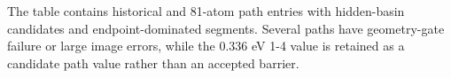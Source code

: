 The table contains historical and 81-atom path entries with hidden-basin candidates and endpoint-dominated segments. Several paths have geometry-gate failure or large image errors, while the 0.336 eV 1-4 value is retained as a candidate path value rather than an accepted barrier.

